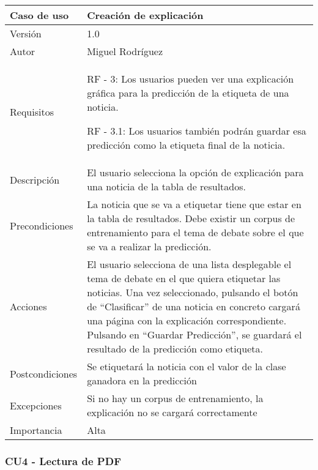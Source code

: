 \begin{center}
\begin{tabular}{ | m{3cm} | m{10cm}| } 
\hline
Caso de uso & Creación de explicación \\ 
\hline
Versión & 1.0 \\ 
\hline
Autor & Miguel Rodríguez \\ 
\hline
Requisitos & RF - 3: Los usuarios pueden ver una explicación gráfica para la predicción de la etiqueta de una noticia.

RF - 3.1: Los usuarios también podrán guardar esa predicción como la etiqueta final de la noticia.\\ 
\hline
Descripción & El usuario selecciona la opción de explicación para una noticia de la tabla de resultados. \\
\hline
Precondiciones & La noticia que se va a etiquetar tiene que estar en la tabla de resultados. Debe existir un corpus de entrenamiento para el tema de debate sobre el que se va a realizar la predicción. \\
\hline
Acciones & El usuario selecciona de una lista desplegable el tema de debate en el que quiera etiquetar las noticias. Una vez seleccionado, pulsando el botón de ``Clasificar'' de una noticia en concreto cargará una página con la explicación correspondiente. Pulsando en ``Guardar Predicción'', se guardará el resultado de la predicción como etiqueta. \\
\hline
Postcondiciones & Se etiquetará la noticia con el valor de la clase ganadora en la predicción \\
\hline
Excepciones & Si no hay un corpus de entrenamiento, la explicación no se cargará correctamente \\
\hline 
Importancia & Alta \\
\hline 
\end{tabular}
\end{center}

\clearpage
\subsubsection{CU4 - Lectura de PDF}

